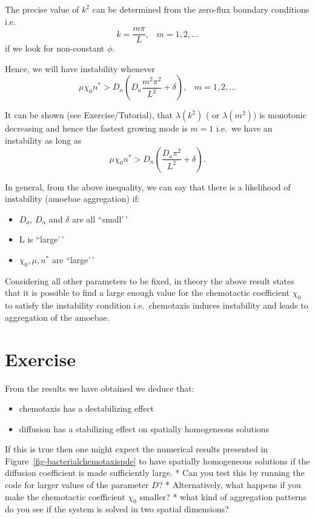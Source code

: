 \documentclass[
  letterpaper,
  DIV=11,
  numbers=noendperiod]{scrreprt}
\providecommand{\tightlist}{%
  \setlength{\itemsep}{0pt}\setlength{\parskip}{0pt}}\usepackage{longtable,booktabs,array}
\theoremstyle{plain}
\theoremstyle{definition}
\theoremstyle{plain}
\theoremstyle{remark}
\begin{document}
The precise value of \(k^2\) can be determined from the zero-flux
boundary conditions i.e. \[ 
k  =  \frac{m \pi}{L}, \;\;\; m = 1,2, \dots 
\] if we look for non-constant \(\phi\).

Hence, we will have instability whenever \[
\mu \chi_0 n^* >  D_n  \left( D_a \frac{m^2 \pi^2}{L^2} + \delta \right), \;\;\; m = 1,2, \dots
\]

It can be shown (see Exercise/Tutorial), that \(\lambda (k^2)\) ( or
\(\lambda (m^2)\)) is monotonic decreasing and hence the fastest growing
mode is \(m=1\) i.e.~we have an instability as long as \[
\mu \chi_0 n^* >  D_n  \left( \frac{D_a \pi^2}{L^2} + \delta \right).
\]

In general, from the above inequality, we can say that there is a
likelihood of instability (amoebae aggregation) if:

\begin{itemize}
\tightlist
\item
  \(D_a\), \(D_n\) and \(\delta\) are all ``small'\,'
\item
  L is ``large'\,'
\item
  \(\chi_0 , \mu , n^*\) are ``large'\,'
\end{itemize}

Considering all other parameters to be fixed, in theory the above result
states that it is possible to find a large enough value for the
chemotactic coefficient \(\chi_0\) to satisfy the instability condition
i.e.~chemotaxis induces instability and leads to aggregation of the
amoebae.

\hypertarget{exercise-1}{%
\section{Exercise}\label{exercise-1}}

From the results we have obtained we deduce that:

\begin{itemize}
\tightlist
\item
  chemotaxis has a destabilizing effect
\item
  diffusion has a stabilizing effect on spatially homogeneous solutions
\end{itemize}

If this is true then one might expect the numerical results presented in
Figure~\ref{fig-bacterialchemotaxispde} to have spatially homogeneous
solutions if the diffusion coefficient is made sufficiently large. * Can
you test this by running the code for larger values of the parameter
\(D\)? * Alternatively, what happens if you make the chemotactic
coefficient \(\chi_0\) smaller? * what kind of aggregation patterns do
you see if the system is solved in two spatial dimensions?
\end{document}

